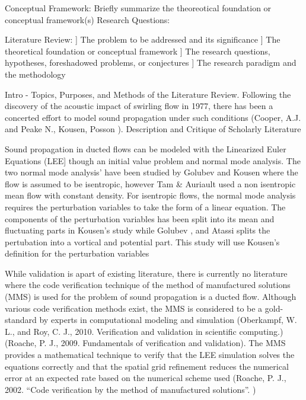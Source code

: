 \documentclass[a4paper]{report}
\begin{document}
\begin{outline}[enumerate]
    \1[1-E.] Conceptual Framework: Briefly summarize the theoreotical foundation 
    or conceptual framework(s) 
    \2 Research Questions:




    \1 Literature Review:
    \1[a]] The problem to be addressed and its significance
    \1[b]] The theoretical foundation or conceptual framework
    \1[c]] The research questions, hypotheses, foreshadowed problems, or conjectures
    \1[d]] The research paradigm and the methodology

    \2 Intro - Topics, Purposes, and Methods of the Literature Review.
    \3 Following the discovery of the acoustic impact of swirling flow in 
    1977, there has been a concerted effort to model sound propagation under
    such conditions (Cooper, A.J. and Peake N., Kousen, Posson ). 
    \2 Description and Critique of Scholarly Literature

    \3 Sound propagation in ducted flows can be modeled with the Linearized
    Euler Equations (LEE] though an initial value problem and normal mode analysis.
    The two normal mode analysis' have been studied by Golubev and Kousen where
    the flow is assumed to be isentropic, however Tam \& Auriault used a 
    non isentropic mean flow with constant density. For isentropic flows,
    the normal mode analysis requires the perturbation variables 
    to take the form of a linear equation. The components of the perturbation variables
    has been split into its mean and fluctuating parts in Kousen's study while
    Golubev , and Atassi splits the pertubation into a vortical and 
    potential part. This study will use Kousen's definition for the perturbation variables

    \4 While validation is apart of existing literature, there is currently
    no literature where the code verification technique of the method of 
    manufactured solutions (MMS) is used for the problem of sound propagation
    is a ducted flow. Although various code verification
    methods exist, the MMS is considered to be a gold-standard by experts 
    in computational modeling and simulation 
    (Oberkampf, W. L., and Roy, C. J., 2010. Verification and validation in scientific computing.)
    (Roache, P. J., 2009. Fundamentals of verification and validation). 
    The MMS provides a mathematical technique to verify that the LEE simulation 
    solves the equations correctly and that the spatial grid refinement 
    reduces the numerical error at an expected rate based on the numerical scheme used 
    (Roache, P. J., 2002. “Code verification by the method of manufactured solutions”. ) 


\end{outline}
\end{document}
